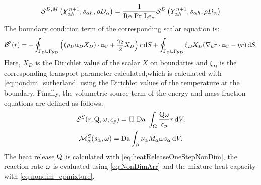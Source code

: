 \begin{equation}
\mathcal{S}^{D,M}\left(Y^{n+1}_{\alpha h},s_{\alpha h},\rho D_\alpha\right) = \frac{1}{\text{Re}~\text{Pr}~\text{Le}_\alpha} \mathcal{S}^D\left(Y^{n+1}_{\alpha h},s_{\alpha h},\rho D_\alpha\right)
\end{equation}
The boundary condition term of the corresponding scalar equation is:
\begin{equation}
	\mathcal{B}^3(r) =  -
	\oint_{\Gamma_{\text{D}}\cup \Gamma_{\text{ND}}}{ \left( (\rho_D\textbf{u}_D X_D)\cdot \textbf{n}_{\Gamma} + \frac{\gamma_2}{2}X_D\right)r \,\mathrm{d} S}
	+\oint_{\Gamma_{\text{D}}\cup \Gamma_{\text{ND}}} \xi_D X_D(\nabla_h r \cdot \textbf{n}_{\Gamma} - \eta r )\,\mathrm{d} S.
\end{equation}
Here, $X_D$ is the Dirichlet value of the scalar $X$ on boundaries and $\xi_D$ is the corresponding transport parameter calculated,which is calculated with \cref{eq:nondim_sutherland} using the Dirichlet values of the temperature at the boundary.
Finally, the volumetric source term of the energy and mass fraction equations are defined as follows:
\begin{gather}
	\mathcal{S}^S(r,\mathrm{Q}, \omega,c_p) =  \text{H}~\text{Da} ~ \int_{\Omega}{ \frac{\mathrm{Q} \omega}{c_p} r} \,\mathrm{d} V, \\
	\mathcal{M}^S_\alpha(s_\alpha,\omega ) =  \text{Da} \int_{\Omega}{  \nu_\alpha M_\alpha \omega s_\alpha} \,\mathrm{d} V.
\end{gather}
The heat release $\mathrm{Q}$ is calculated with \cref{eq:heatReleaseOneStepNonDim}, the reaction rate $\omega$ is evaluated using \cref{eq:NonDimArr} and the mixture heat capacity with \cref{eq:nondim_cpmixture}.


